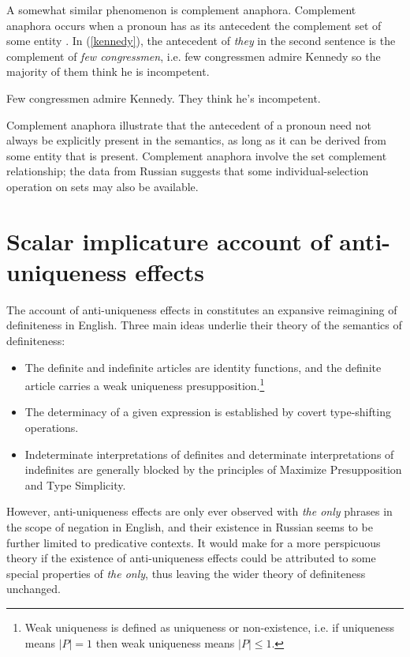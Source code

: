 \documentclass{article}
\begin{document}
A somewhat similar phenomenon is complement anaphora. Complement anaphora occurs when a pronoun has as its antecedent the complement set of some entity \citep{nouwen03, schwarz09}. In (\ref{kennedy}), the antecedent of \textit{they} in the second sentence is the complement of \textit{few congressmen}, i.e. few congressmen admire Kennedy so the majority of them think he is incompetent.

\begin{exe}
	\ex \label{kennedy} Few congressmen admire Kennedy. They think he's incompetent.
\end{exe}

Complement anaphora illustrate that the antecedent of a pronoun need not always be explicitly present in the semantics, as long as it can be derived from some entity that is present. Complement anaphora involve the set complement relationship; the data from Russian suggests that some individual-selection operation on sets may also be available.


\section{Scalar implicature account of anti-uniqueness effects \label{sec:scalar}}
The account of anti-uniqueness effects in \citet{cb2015, cb2012a} constitutes an expansive reimagining of definiteness in English. Three main ideas underlie their theory of the semantics of definiteness:

\begin{itemize}
	\item The definite and indefinite articles are identity functions, and the definite article carries a weak uniqueness presupposition.\footnote{Weak uniqueness is defined as uniqueness or non-existence, i.e. if uniqueness means $|P| = 1$ then weak uniqueness means $|P| \le 1$.}
	\item The determinacy of a given expression is established by covert type-shifting operations.
	\item Indeterminate interpretations of definites and determinate interpretations of indefinites are generally blocked by the principles of Maximize Presupposition and Type Simplicity.
\end{itemize}

However, anti-uniqueness effects are only ever observed with \textit{the only} phrases in the scope of negation in English, and their existence in Russian seems to be further limited to predicative contexts. It would make for a more perspicuous theory if the existence of anti-uniqueness effects could be attributed to some special properties of \textit{the only}, thus leaving the wider theory of definiteness unchanged.
\end{document}
